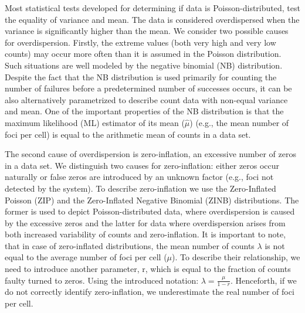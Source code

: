 
Most statistical tests developed for determining if data is Poisson-distributed, test the equality of variance and mean. The data is considered overdispersed when the variance is significantly higher than the mean. We consider two possible causes for overdispersion. Firstly, the extreme values (both very high and very low counts) may occur more often than it is assumed in the Poisson distribution. Such situations are well modeled by the negative binomial (NB) distribution. Despite the fact that the NB distribution is used primarily for counting the number of failures before a predetermined number of successes occurs, it can be also alternatively parametrized to describe count data with non-equal variance and mean. One of the important properties of the NB distribution is that the maximum likelihood (ML) estimator of its mean ($\hat{\mu}$) (e.g., the mean number of foci per cell) is equal to the arithmetic mean of counts in a data set.

The second cause of overdispersion is zero-inflation, an excessive number of zeros in a data set. We distinguish two causes for zero-inflation: either zeros occur naturally or false zeros are introduced by an unknown factor (e.g., foci not detected by the system). To describe zero-inflation we use the Zero-Inflated Poisson (ZIP) and the Zero-Inflated Negative Binomial (ZINB) distributions. The former is used to depict Poisson-distributed data, where overdispersion is caused by the excessive zeros and the latter for data where overdispersion arises from both increased variability of counts and zero-inflation. It is important to note, that in case of zero-inflated distributions, the mean number of counts $\lambda$ is not equal to the average number of foci per cell ($\mu$). To describe their relationship, we need to introduce another parameter, r, which is equal to the fraction of counts faulty turned to zeros. Using the introduced notation: $\lambda = \frac{\mu}{1 - r}$. Henceforth, if we do not correctly identify zero-inflation, we underestimate the real number of foci per cell.

